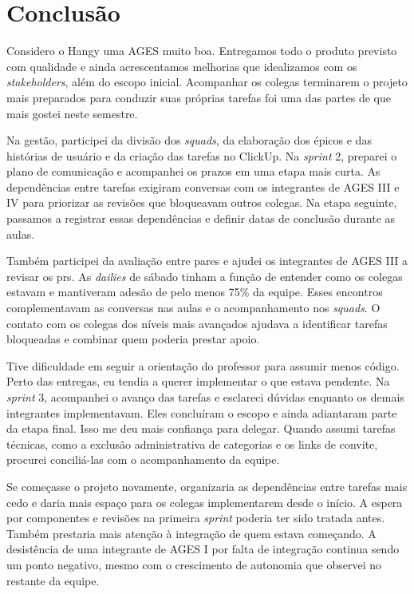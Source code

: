 \section[Conclusão]{Conclusão}

Considero o Hangy uma AGES muito boa. Entregamos todo o produto previsto com
qualidade e ainda acrescentamos melhorias que idealizamos com os
\textit{stakeholders}, além do escopo inicial. Acompanhar os colegas terminarem o projeto mais preparados para conduzir
suas próprias tarefas foi uma das partes de que mais gostei neste semestre.

Na gestão, participei da divisão dos \textit{squads}, da elaboração dos épicos
e das histórias de usuário e da criação das tarefas no ClickUp. Na
\textit{sprint} 2, preparei o plano de comunicação e acompanhei os prazos em
uma etapa mais curta. As dependências entre tarefas exigiram conversas com
os integrantes de AGES III e IV para priorizar as revisões que bloqueavam
outros colegas. Na etapa seguinte, passamos a registrar essas dependências
e definir datas de conclusão durante as aulas.

Também participei da avaliação entre pares e ajudei os integrantes de
AGES III a revisar os \acp{pr}. As \textit{dailies} de sábado tinham a
função de entender como os colegas estavam e mantiveram adesão de pelo
menos 75\% da equipe. Esses encontros complementavam as conversas nas aulas
e o acompanhamento nos \textit{squads}. O contato com os colegas dos níveis
mais avançados ajudava a identificar tarefas bloqueadas e combinar quem
poderia prestar apoio.

Tive dificuldade em seguir a orientação do professor para assumir menos
código. Perto das entregas, eu tendia a querer implementar o que estava
pendente. Na \textit{sprint} 3, acompanhei o avanço das tarefas e
esclareci dúvidas enquanto os demais integrantes implementavam. Eles
concluíram o escopo e ainda adiantaram parte da etapa final. Isso me deu
mais confiança para delegar. Quando assumi tarefas técnicas, como a exclusão
administrativa de categorias e os links de convite, procurei conciliá-las
com o acompanhamento da equipe.

Se começasse o projeto novamente, organizaria as dependências entre tarefas
mais cedo e daria mais espaço para os colegas implementarem desde o início.
A espera por componentes e revisões na primeira \textit{sprint} poderia ter
sido tratada antes. Também prestaria mais atenção à integração de quem estava
começando. A desistência de uma integrante de AGES I por falta de integração
continua sendo um ponto negativo, mesmo com o crescimento de autonomia que
observei no restante da equipe.


